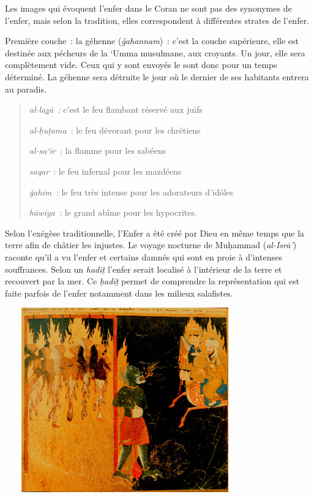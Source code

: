 
Les images qui évoquent l'enfer dans le Coran ne sont pas des synonymes
de l'enfer, mais selon la tradition, elles correspondent à différentes
strates de l'enfer.

Première couche~: la géhenne (\emph{ğahannam})~: c'est la couche
supérieure, elle est destinée aux pécheurs de la `Umma musulmane, aux
croyants. Un jour, elle sera complètement vide. Ceux qui y sont envoyés
le sont donc pour un temps déterminé. La géhenne sera détruite le jour
où le dernier de ses habitants entrera au paradis.

\begin{quote}
\emph{al-la\underline{z}ā~:} c'est le feu flambant réservé aux juifs

\emph{al-ḥuṭama~}: le feu dévorant pour les chrétiens

\emph{al-sa`īr~}: la flamme pour les sabéens

\emph{saqar}~: le feu infernal pour les mazdéens

\emph{ǧahīm~:} le feu très intense pour les adorateurs d'idôles

\emph{hāwiya~:} le grand abîme pour les hypocrites.
\end{quote}


Selon l'exégèse traditionnelle, l'Enfer a été créé par Dieu en même
temps que la terre afin de châtier les injustes. Le voyage nocturne de
Muḥammad (\emph{al-Isrā'}) raconte qu'il a vu l'enfer et certains damnés
qui sont en proie à d'intenses souffrances. Selon un \emph{hadīṯ}
l'enfer serait localisé à l'intérieur de la terre et recouvert par la
mer. Ce \emph{ḥadīṯ} permet de
comprendre la représentation qui est faite parfois de l'enfer notamment
dans les milieux salafistes.

\includegraphics[width=4.07818in,height=3.13349in]{Images/Enfer.jpg}

